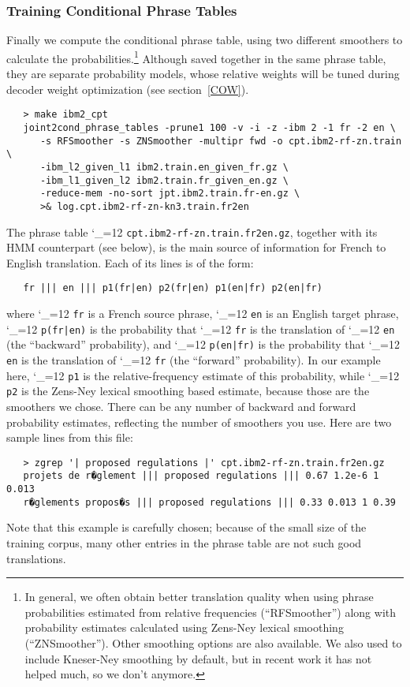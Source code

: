 \documentclass[11pt,letterpaper]{article}
\def\code{\begingroup\catcode`\_=12 \codex}
\newcommand{\codex}[1]{\texttt{#1}\endgroup}
\begin{document}
\subsubsection*{Training Conditional Phrase Tables}

Finally we compute the conditional phrase table, using two different
smoo\-thers to calculate the probabilities.\footnote{In general, we often obtain
better translation quality when using phrase probabilities estimated from
relative frequencies (``RFSmoother'') along with probability estimates
calculated using Zens-Ney lexical smoothing (``ZNSmoother''). Other smoothing
options are also available. We also used to include Kneser-Ney smoothing by
default, but in recent work it has not helped much, so we don't anymore.}
Although saved together in the same phrase table, they are separate probability
models, whose relative weights will be tuned during decoder weight optimization
(see section~\ref{COW}).
\begin{small}
\begin{verbatim}
   > make ibm2_cpt
   joint2cond_phrase_tables -prune1 100 -v -i -z -ibm 2 -1 fr -2 en \
      -s RFSmoother -s ZNSmoother -multipr fwd -o cpt.ibm2-rf-zn.train \
      -ibm_l2_given_l1 ibm2.train.en_given_fr.gz \
      -ibm_l1_given_l2 ibm2.train.fr_given_en.gz \
      -reduce-mem -no-sort jpt.ibm2.train.fr-en.gz \
      >& log.cpt.ibm2-rf-zn-kn3.train.fr2en
\end{verbatim}
\end{small}
The phrase table \code{cpt.ibm2-rf-zn.train.fr2en.gz}, together with its HMM
counterpart (see below), is the main source of information for French to
English translation. Each of its lines is of the form:
\begin{verbatim}
   fr ||| en ||| p1(fr|en) p2(fr|en) p1(en|fr) p2(en|fr)
\end{verbatim}
where \code{fr} is a French source phrase, \code{en} is an English target
phrase, \code{p(fr|en)} is the probability that \code{fr} is the
translation of \code{en} (the ``backward'' probability), and
\code{p(en|fr)} is the probability that \code{en} is the translation of
\code{fr} (the ``forward'' probability). In our example here, \code{p1} is
the relative-frequency estimate of this probability, while \code{p2} is the
Zens-Ney lexical smoothing based estimate, because those are the smoothers we
chose. There can be any number of backward and forward probability estimates,
reflecting the number of smoothers you use.
%
Here are two sample lines from this file:
\begin{small}
\begin{verbatim}
   > zgrep '| proposed regulations |' cpt.ibm2-rf-zn.train.fr2en.gz 
   projets de r�glement ||| proposed regulations ||| 0.67 1.2e-6 1 0.013
   r�glements propos�s ||| proposed regulations ||| 0.33 0.013 1 0.39
\end{verbatim}
\end{small}
Note that this example is carefully chosen; because of the small size of the
training corpus, many other entries in the phrase table are not such good
translations.
\end{document}
